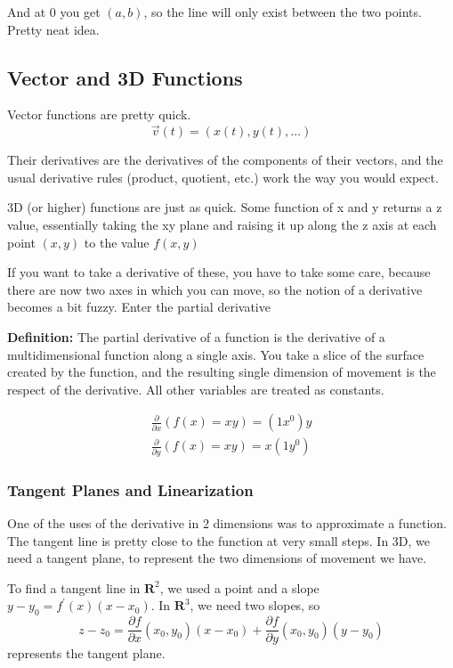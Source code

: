 \documentclass[12pt, letterpaper]{article}
\begin{document}
And at 0 you get $(a, b)$, so the line will only exist between the two points. Pretty neat idea.

\subsection{Vector and 3D Functions}

Vector functions are pretty quick.
\begin{displaymath}
    \vec{v}(t) = (x(t), y(t), \dots)
\end{displaymath}

Their derivatives are the derivatives of the components of their vectors, and the usual derivative rules (product, quotient, etc.) work the way you would expect.

3D (or higher) functions are just as quick. Some function of x and y returns a z value, essentially taking the xy plane and raising it up along the z axis at each point $(x, y)$ to the value $f(x, y)$

If you want to take a derivative of these, you have to take some care, because there are now two axes in which you can move, so the notion of a derivative becomes a bit fuzzy. Enter the partial derivative

\textbf{Definition:} The partial derivative of a function is the derivative of a multidimensional function along a single axis. You take a slice of the surface created by the function, and the resulting single dimension of movement is the respect of the derivative. All other variables are treated as constants.

\begin{gather*}
    \frac{\partial}{\partial x}(f(x) = xy) = (1x^0)y \\
    \frac{\partial}{\partial y}(f(x) = xy) = x(1y^0)
\end{gather*}

\subsubsection{Tangent Planes and Linearization}
One of the uses of the derivative in 2 dimensions was to approximate a function. The tangent line is pretty close to the function at very small steps. In 3D, we need a tangent plane, to represent the two dimensions of movement we have.

To find a tangent line in $\textbf{R}^2$, we used a point and a slope $y - y_0 = f^\prime (x)(x-x_0)$. In $\textbf{R}^3$, we need two slopes, so 
\begin{displaymath}
    z - z_0 = \frac{\partial f}{\partial x}(x_0, y_0)(x - x_0) + \frac{\partial f}{\partial y}(x_0, y_0)(y - y_0)
\end{displaymath}
represents the tangent plane.
\end{document}
